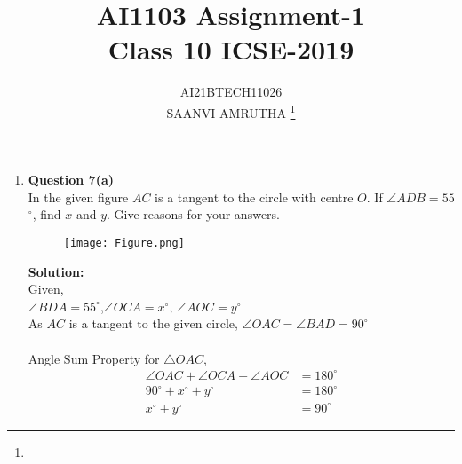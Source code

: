 \documentclass[journal,12pt,twocolumn]{IEEEtran}
\begin{document}
\let\vec\mathbf
\renewcommand{\thefigure}{\theproblem}
\def\putbox#1#2#3{\makebox[0in][l]{\makebox[#1][l]{}\raisebox{\baselineskip}[0in][0in]{\raisebox{#2}[0in][0in]{#3}}}}
     \def\rightbox#1{\makebox[0in][r]{#1}}
     \def\centbox#1{\makebox[0in]{#1}}
     \def\topbox#1{\raisebox{-\baselineskip}[0in][0in]{#1}}
     \def\midbox#1{\raisebox{-0.5\baselineskip}[0in][0in]{#1}}
\vspace{3cm}
\title{AI1103 Assignment-1\\Class 10 ICSE-2019}
\author{AI21BTECH11026\\SAANVI AMRUTHA
	\thanks{}
}
\maketitle
\newpage
\bigskip

\begin{enumerate}[label=,ref=]

\item \textbf{Question 7(a)}\\ 
In the given figure $AC$ is a tangent to the circle with centre $O$. If $\angle$$ADB=55$$^{\circ}$, find $x$ and $y$. Give reasons for your answers.\\

\begin{figure}[h]

\texttt{[image: Figure.png]}
\label{Fig}
\end{figure}


\textbf{Solution:} \\


Given,\\

$\angle BDA=55^\circ$,$\angle OCA=x^\circ$, $\angle AOC=y^\circ$\\

As $AC$ is a tangent to the given circle, $\angle OAC=\angle BAD=90^\circ$\\
\\
Angle Sum Property for $\triangle OAC$, 
        \begin{align}
             \angle OAC+\angle OCA+\angle AOC&=180^\circ \\
              90^\circ+x^\circ+y^\circ&=180^\circ\\
             x^\circ+y^\circ&=90^\circ
               \end{align} 
             

\end{enumerate}
\end{document}
